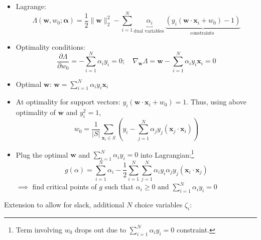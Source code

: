 \documentclass[11pt, %
	oneside, %
	english, %
	onehalfspacing, %
	parskip, %
	]{article} %
\theoremstyle{definition}
\begin{document}
\begin{itemize}
	\item Lagrange:
	\begin{equation*}
		\Lambda\left(\mathbf{w}, w_0 ; \boldsymbol{\alpha}\right)=\frac{1}{2}\|\mathbf{w}\|_2^2-\sum_{i=1}^N \underbrace{\alpha_i}_{\text {dual variables }} \underbrace{\left(y_i\left(\mathbf{w} \cdot \mathbf{x}_i+w_0\right)-1\right)}_{\text {constraints }}
	\end{equation*}
	\item Optimality conditions:
	\begin{equation*}
		\frac{\partial \Lambda}{\partial w_0}=-\sum_{i=1}^N \alpha_i y_i = 0; \quad \nabla_{\mathbf{w}} \Lambda=\mathbf{w}-\sum_{i=1}^N \alpha_i y_i \mathbf{x}_i = 0
	\end{equation*}
	\item Optimal $\mathbf{w}$: $\mathbf{w}=\sum_{i=1}^N \alpha_i y_i \mathbf{x}_i$
	\item At optimality for support vectors: $y_i\left(\mathbf{w} \cdot \mathbf{x}_i+w_0\right)=1$. Thus, using above optimality of $\mathbf{w}$ and $y_i^2 = 1$,
	\begin{equation*}
		w_0=\frac{1}{|S|} \sum_{\mathbf{x}_i \in S}\left(y_i-\sum_{j=1}^N \alpha_j y_j\left(\mathbf{x}_j \cdot \mathbf{x}_i\right)\right)
	\end{equation*}
	\item Plug the optimal $\mathbf{w}$ and $\sum_{i=1}^N \alpha_i y_i=0$ into Lagrangian:\footnote{Term involving $w_0$ drops out due to $\sum_{i=1}^N \alpha_i y_i = 0$ constraint.}
	\begin{equation*}
		g(\alpha) = \sum_{i=1}^N \alpha_i-\frac{1}{2} \sum_{i=1}^N \sum_{j=1}^N \alpha_i y_i \alpha_j y_j\left(\mathbf{x}_i \cdot \mathbf{x}_j\right)
	\end{equation*}
	$\implies$ find critical points of $g$ such that $\alpha_i \geq 0 \text { and } \sum_{i=1}^N \alpha_i y_i=0$
\end{itemize}

Extension to allow for slack, additional $N$ choice variables $\zeta_i$:
\end{document}
